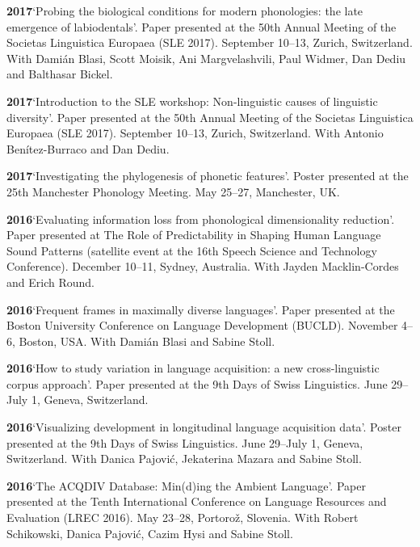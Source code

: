 \documentclass[11pt]{article}
\newcommand{\hangpara}{
 \setlength{\parindent}{0in} %
 \hangindent=0.42in %
}
\begin{document}
\vskip 6pt
\hangpara
{\bf 2017}\hspace{1ex}`Probing the biological conditions for modern phonologies: the late emergence of labiodentals'. Paper presented at the 50th Annual Meeting of the Societas Linguistica Europaea (SLE 2017). September 10--13, Zurich, Switzerland. With Dami{\'a}n Blasi, Scott Moisik, Ani Margvelashvili, Paul Widmer, Dan Dediu and Balthasar Bickel.

\vskip 6pt
\hangpara
{\bf 2017}\hspace{1ex}`Introduction to the SLE workshop: Non-linguistic causes of linguistic diversity'. Paper presented at the 50th Annual Meeting of the Societas Linguistica Europaea (SLE 2017). September 10--13, Zurich, Switzerland. With Antonio Benítez-Burraco and Dan Dediu.

\vskip 6pt
\hangpara
{\bf 2017}\hspace{1ex}`Investigating the phylogenesis of phonetic features'. Poster presented at the 25th Manchester Phonology Meeting. May 25--27, Manchester, UK.

\vskip 6pt
\hangpara
{\bf 2016}\hspace{1ex}`Evaluating information loss from phonological dimensionality reduction'. Paper presented at The Role of Predictability in Shaping Human Language Sound Patterns (satellite event at the 16th Speech Science and Technology Conference). December 10--11, Sydney, Australia. With Jayden Macklin-Cordes and Erich Round.

\vskip 6pt
\hangpara
{\bf 2016}\hspace{1ex}`Frequent frames in maximally diverse languages'. Paper presented at the Boston University Conference on Language Development (BUCLD). November 4--6, Boston, USA. With Dami{\'a}n Blasi and Sabine Stoll.

\vskip 6pt
\hangpara
{\bf 2016}\hspace{1ex}`How to study variation in language acquisition: a new cross-linguistic corpus approach'. Paper presented at the 9th Days of Swiss Linguistics. June 29--July 1, Geneva, Switzerland.

\vskip 6pt
\hangpara
{\bf 2016}\hspace{1ex}`Visualizing development in longitudinal language acquisition data'. Poster presented at the 9th Days of Swiss Linguistics. June 29--July 1, Geneva, Switzerland. With Danica Pajovi{\'c}, Jekaterina Mazara and Sabine Stoll.

\vskip 6pt
\hangpara
{\bf 2016}\hspace{1ex}`The ACQDIV Database: Min(d)ing the Ambient Language'. Paper presented at the Tenth International Conference on Language Resources and Evaluation (LREC 2016). May 23--28, Portoro{\v z}, Slovenia. With Robert Schikowski, Danica Pajovi{\'c}, Cazim Hysi and Sabine Stoll.
\end{document}

